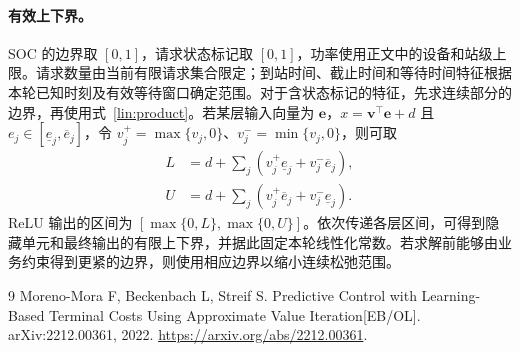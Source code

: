 \documentclass[12pt,a4paper,UTF8]{ctexart}
\numberwithin{equation}{section}
\begin{document}
\paragraph{有效上下界。}
SOC 的边界取 $[0,1]$，请求状态标记取 $[0,1]$，功率使用正文中的设备和站级上限。请求数量由当前有限请求集合限定；到站时间、截止时间和等待时间特征根据本轮已知时刻及有效等待窗口确定范围。对于含状态标记的特征，先求连续部分的边界，再使用式~\eqref{lin:product}。若某层输入向量为 $\boldsymbol e$，$x=\boldsymbol v^\top\boldsymbol e+d$ 且 $e_j\in[\underline e_j,\overline e_j]$，令 $v_j^+=\max\{v_j,0\}$、$v_j^-=\min\{v_j,0\}$，则可取
\begin{equation}
\begin{aligned}
L&=d+\sum_j\left(v_j^+\underline e_j+v_j^-\overline e_j\right),\\
U&=d+\sum_j\left(v_j^+\overline e_j+v_j^-\underline e_j\right).
\end{aligned}
\label{lin:interval}
\end{equation}
ReLU 输出的区间为 $[\max\{0,L\},\max\{0,U\}]$。依次传递各层区间，可得到隐藏单元和最终输出的有限上下界，并据此固定本轮线性化常数。若求解前能够由业务约束得到更紧的边界，则使用相应边界以缩小连续松弛范围。


\begin{thebibliography}{9}
Moreno-Mora F, Beckenbach L, Streif S.
Predictive Control with Learning-Based Terminal Costs Using Approximate Value Iteration[EB/OL].
arXiv:2212.00361, 2022.
\url{https://arxiv.org/abs/2212.00361}.
\end{thebibliography}
\end{document}
